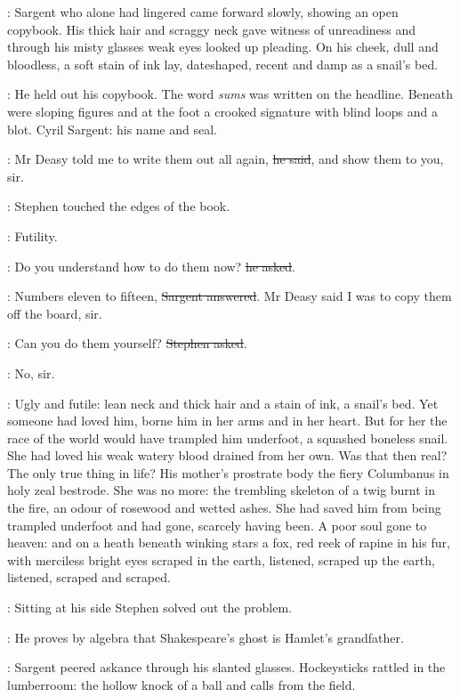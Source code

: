 :
Sargent who alone had lingered
came forward slowly, showing an open copybook.
His thick hair and scraggy neck gave witness of unreadiness
and through his misty glasses weak eyes looked up pleading.
On his cheek, dull and bloodless,
a soft stain of ink lay, dateshaped,
recent and damp as a snail's bed.

:
He held out his copybook.
The word \emph{sums} was written on the headline.
Beneath were sloping figures
and at the foot a crooked signature with blind loops and a blot.
Cyril Sargent: his name and seal.

\sargent:
Mr Deasy told me to write them out all again, \sout{he said},
and show them to you, sir.

:
Stephen touched the edges of the book.

\StephenInt:
Futility.

\Stephen:
Do you understand how to do them now?
\sout{he asked}.

\sargent:
Numbers eleven to fifteen,
\sout{Sargent answered}.
Mr Deasy said I was to copy them off the board, sir.

\Stephen:
Can you do them yourself?
\sout{Stephen asked}.

\sargent:
No, sir.

\StephenInt:
Ugly and futile:
lean neck and thick hair
and a stain of ink, a snail's bed.
Yet someone had loved him,
borne him in her arms and in her heart.
But for her the race of the world would have trampled him underfoot,
a squashed boneless snail.
She had loved his weak watery blood drained from her own.
Was that then real?
The only true thing in life?
His mother's prostrate body
the fiery Columbanus in holy zeal bestrode.
She was no more:
the trembling skeleton of a twig burnt in the fire,
an odour of rosewood and wetted ashes.
She had saved him from being trampled underfoot
and had gone, scarcely having been.
A poor soul gone to heaven:
and on a heath beneath winking stars
a fox, red reek of rapine in his fur,
with merciless bright eyes scraped in the earth,
listened, scraped up the earth,
listened, scraped and scraped.

:
Sitting at his side Stephen solved out the problem.

\mulligan:
He proves by algebra that Shakespeare's ghost is Hamlet's grandfather.

:
Sargent peered askance through his slanted glasses.
Hockeysticks rattled in the lumberroom:
the hollow knock of a ball and calls from the field.

